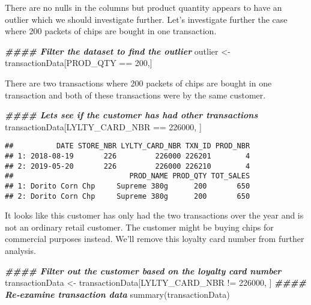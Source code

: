 \documentclass[
]{article}
\newenvironment{Shaded}{\begin{snugshade}}{\end{snugshade}}
\newcommand{\DecValTok}[1]{\textcolor[rgb]{0.00,0.00,0.81}{#1}}
\newcommand{\DocumentationTok}[1]{\textcolor[rgb]{0.56,0.35,0.01}{\textbf{\textit{#1}}}}
\newcommand{\FunctionTok}[1]{\textcolor[rgb]{0.00,0.00,0.00}{#1}}
\newcommand{\NormalTok}[1]{#1}
\newcommand{\OtherTok}[1]{\textcolor[rgb]{0.56,0.35,0.01}{#1}}
\newcommand{\SpecialCharTok}[1]{\textcolor[rgb]{0.00,0.00,0.00}{#1}}
\begin{document}
There are no nulls in the columns but product quantity appears to have
an outlier which we should investigate further. Let's investigate
further the case where 200 packets of chips are bought in one
transaction.

\begin{Shaded}
\begin{Highlighting}[]
\DocumentationTok{\#\#\#\# Filter the dataset to find the outlier}
\NormalTok{outlier }\OtherTok{\textless{}{-}}\NormalTok{ transactionData[PROD\_QTY }\SpecialCharTok{==} \DecValTok{200}\NormalTok{,]}
\end{Highlighting}
\end{Shaded}

There are two transactions where 200 packets of chips are bought in one
transaction and both of these transactions were by the same customer.

\begin{Shaded}
\begin{Highlighting}[]
\DocumentationTok{\#\#\#\# Let\textquotesingle{}s see if the customer has had other transactions}
\NormalTok{transactionData[LYLTY\_CARD\_NBR }\SpecialCharTok{==} \DecValTok{226000}\NormalTok{, ]}
\end{Highlighting}
\end{Shaded}

\begin{verbatim}
##          DATE STORE_NBR LYLTY_CARD_NBR TXN_ID PROD_NBR
## 1: 2018-08-19       226         226000 226201        4
## 2: 2019-05-20       226         226000 226210        4
##                           PROD_NAME PROD_QTY TOT_SALES
## 1: Dorito Corn Chp     Supreme 380g      200       650
## 2: Dorito Corn Chp     Supreme 380g      200       650
\end{verbatim}

It looks like this customer has only had the two transactions over the
year and is not an ordinary retail customer. The customer might be
buying chips for commercial purposes instead. We'll remove this loyalty
card number from further analysis.

\begin{Shaded}
\begin{Highlighting}[]
\DocumentationTok{\#\#\#\# Filter out the customer based on the loyalty card number}
\NormalTok{transactionData }\OtherTok{\textless{}{-}}\NormalTok{ transactionData[LYLTY\_CARD\_NBR }\SpecialCharTok{!=} \DecValTok{226000}\NormalTok{, ]}
\DocumentationTok{\#\#\#\# Re‐examine transaction data}
\FunctionTok{summary}\NormalTok{(transactionData)}
\end{Highlighting}
\end{Shaded}
\end{document}
